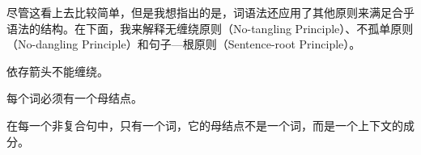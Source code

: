 
尽管这看上去比较简单，但是我想指出的是，词语法还应用了其他原则来满足合乎语法的结构。在下面，我来解释无缠绕原则（No-tangling Principle）、不孤单原则（No-dangling Principle）和句子—根原则（Sentence-root Principle）。
\begin{principle}[无缠绕原则]
依存箭头不能缠绕。
\end{principle}

\begin{principle}[不孤单原则]
每个词必须有一个母结点。
\end{principle}

\begin{principle}[句子—根原则]
在每一个非复合句中，只有一个词，它的母结点不是一个词，而是一个上下文的成分。
\end{principle}

